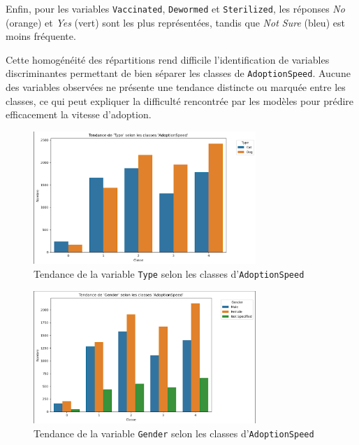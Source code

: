 \documentclass[a4paper,12pt]{article}
\begin{document}
Enfin, pour les variables \texttt{Vaccinated}, \texttt{Dewormed} et \texttt{Sterilized}, les réponses \textit{No} (orange) et \textit{Yes} (vert) sont les plus représentées, tandis que \textit{Not Sure} (bleu) est moins fréquente.

Cette homogénéité des répartitions rend difficile l’identification de variables discriminantes permettant de bien séparer les classes de \texttt{AdoptionSpeed}. Aucune des variables observées ne présente une tendance distincte ou marquée entre les classes, ce qui peut expliquer la difficulté rencontrée par les modèles pour prédire efficacement la vitesse d’adoption.

\begin{figure}[H]
    \centering
    \includegraphics[width=0.75\textwidth]{type_adoption_trend.png}
    \caption{Tendance de la variable \texttt{Type} selon les classes d'\texttt{AdoptionSpeed}}
    \label{fig:type_trend}
\end{figure}

\begin{figure}[H]
    \centering
    \includegraphics[width=0.75\textwidth]{gender_adoption_trend.png}
    \caption{Tendance de la variable \texttt{Gender} selon les classes d'\texttt{AdoptionSpeed}}
    \label{fig:gender_trend}
\end{figure}
\end{document}
